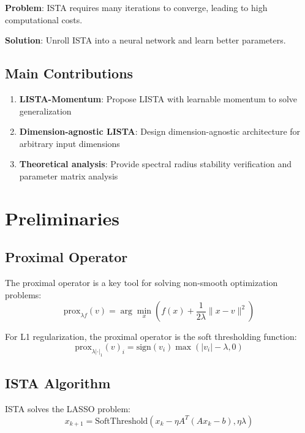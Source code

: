 \documentclass[11pt,a4paper]{article}
\begin{document}
\textbf{Problem}: ISTA requires many iterations to converge, leading to high computational costs.

\textbf{Solution}: Unroll ISTA into a neural network and learn better parameters.

\subsection{Main Contributions}

\begin{enumerate}
    \item \textbf{LISTA-Momentum}: Propose LISTA with learnable momentum to solve generalization
    \item \textbf{Dimension-agnostic LISTA}: Design dimension-agnostic architecture for arbitrary input dimensions
    \item \textbf{Theoretical analysis}: Provide spectral radius stability verification and parameter matrix analysis
\end{enumerate}

\section{Preliminaries}
\label{sec:prelim}

\subsection{Proximal Operator}

The proximal operator is a key tool for solving non-smooth optimization problems:
\begin{equation}
    \text{prox}_{\lambda f}(v) = \arg\min_x \left( f(x) + \frac{1}{2\lambda} \|x - v\|^2 \right)
\end{equation}

For L1 regularization, the proximal operator is the soft thresholding function:
\begin{equation}
    \text{prox}_{\lambda|\cdot|_1}(v)_i = \text{sign}(v_i) \max(|v_i| - \lambda, 0)
\end{equation}

\subsection{ISTA Algorithm}

ISTA solves the LASSO problem:
\begin{equation}
    x_{k+1} = \text{SoftThreshold}(x_k - \eta A^T(Ax_k - b), \eta\lambda)
\end{equation}
\end{document}
